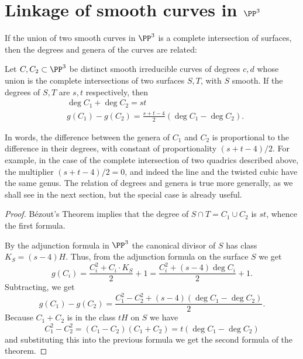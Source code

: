 \section{Linkage of smooth curves in $\PP^3$}\label{SLinkage}\label{linkage section}

If the union of two smooth curves in $\PP^3$ is a complete intersection of surfaces, then the degrees and genera
of the curves are related:

\begin{theorem}\label{liaison genus formula-first version} Let $C, {C_2}\subset \PP^3$ be distinct smooth irreducible curves of degrees $c,d$ whose union is the complete intersections of two surfaces $S,T$, with $S$ smooth. If the degrees of $S,T$ are $s,t$ respectively, then
$$
\begin{aligned}
&\deg C_1+\deg C_2 = st\\
&g(C_1) - g({C_2}) = \frac{s+t-4}{2}(\deg C_1-\deg {C_2}).
\end{aligned}
 $$
\end{theorem}
In words, the difference between the genera of $C_1$ and ${C_2}$ is proportional to the difference in their degrees, with constant of proportionality $(s+t-4)/2$. For example, in the case of the complete intersection of two quadrics
described above, the multiplier $(s+t-4)/2 = 0$, and indeed the line and the twisted cubic have the same genus.
The relation of degrees and genera is true more generally, as we shall see in the next section, but the special
case is already useful.

\begin{proof}
B\'ezout's Theorem implies that the degree of $S\cap T = C_1\cup C_2$ is $st$, whence the first formula.

By the adjunction formula in $\PP^3$ the canonical divisor of $S$ has class $K_S = (s-4)H$. Thus, from the 
adjunction formula on the surface $S$ we get
$$
g(C_i) = \frac{C_i^2+C_i\cdot K_S}{2}+1 = \frac{C_i^2+(s-4) \deg C_i}{2}+1.
$$
Subtracting, we get
$$
g(C_1)-g(C_2) = \frac{C_1^2-C_2^2+(s-4) (\deg C_1-\deg C_2)} {2}.
$$
Because $C_1+C_2$ is in the class $tH$ on $S$ we have
$$
C_1^2-C_2^2 = (C_1-C_2)(C_1+C_2) = t(\deg C_1-\deg C_2)
$$
and substituting this into the previous formula we get the second formula of the theorem.
\end{proof}

